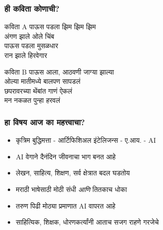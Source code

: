 
\begin{frame}[fragile]\frametitle{ही कविता कोणाची?}

\begin{block}{कविता A}
पाऊस पडला झिम झिम झिम  \\
अंगण झाले ओले चिंब  \\
पाऊस पडला मुसळधार  \\
रान झाले हिरवेगार
\end{block}

\begin{block}{कविता B}
पाऊस आला, आठवणी जाग्या झाल्या  \\
ओल्या मातीमध्ये बालपण सापडलं  \\
छपरावरच्या थेंबांत गाणं ऐकलं  \\
मन नकळत पुन्हा हरवलं
\end{block}


\end{frame}

\begin{frame}[fragile]\frametitle{हा विषय आज का महत्त्वाचा?}

\begin{itemize}
\item कृत्रिम बुद्धिमत्ता - आर्टिफिशिअल इंटेलिजन्स - ए.आय. - AI
\item AI वेगाने दैनंदिन जीवनाचा भाग बनत आहे
\item लेखन, साहित्य, शिक्षण, सर्व क्षेत्रात बदल घडतोय
\item मराठी भाषेसाठी मोठी संधी \textit{आणि} तितकाच धोका
\item तरुण पिढी मोठ्या प्रमाणात AI वापरत आहे
\item साहित्यिक, शिक्षक, धोरणकर्त्यांनी आताच सजग राहणे गरजेचे
\end{itemize}

\end{frame}

